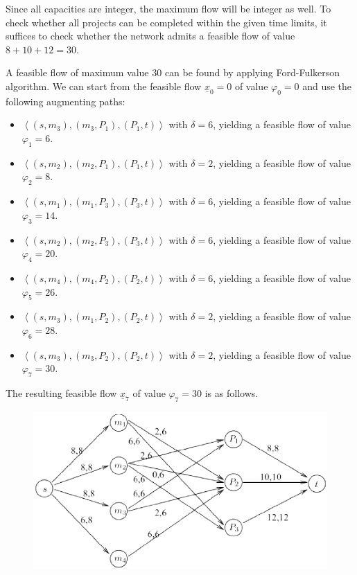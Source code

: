 \documentclass[12pt, a4paper]{report}
\begin{document}
        Since all capacities are integer, the maximum flow will be integer as well. To check whether all projects can be completed within the given time limits, it suffices to check 
        whether the network admits a feasible flow of value $8 + 10 + 12 = 30$.

        A feasible flow of maximum value $30$ can be found by applying Ford-Fulkerson algorithm. We can start from the feasible flow $\underline{x}_0 = 0$ of value $\varphi_0 = 0$ 
        and use the following augmenting paths:
        \begin{itemize}
            \item $\left\langle (s, m_3),(m_3, P_1),(P_1, t) \right\rangle$ with $\delta = 6$, yielding a feasible flow of value $\varphi_1 = 6$.
            \item $\left\langle (s, m_2),(m_2, P_1),(P_1, t) \right\rangle$ with $\delta = 2$, yielding a feasible flow of value $\varphi_2 = 8$.
            \item $\left\langle (s, m_1),(m_1, P_3),(P_3, t) \right\rangle$ with $\delta = 6$, yielding a feasible flow of value $\varphi_3 = 14$.
            \item $\left\langle (s, m_2),(m_2, P_3),(P_3, t) \right\rangle$ with $\delta = 6$, yielding a feasible flow of value $\varphi_4 = 20$.
            \item $\left\langle (s, m_4),(m_4, P_2),(P_2, t) \right\rangle$ with $\delta = 6$, yielding a feasible flow of value $\varphi_5 = 26$.
            \item $\left\langle (s, m_3),(m_1, P_2),(P_2, t) \right\rangle$ with $\delta = 2$, yielding a feasible flow of value $\varphi_6 = 28$.
            \item $\left\langle (s, m_3),(m_3, P_2),(P_2, t) \right\rangle$ with $\delta = 2$, yielding a feasible flow of value $\varphi_7 = 30$.
        \end{itemize}
        The resulting feasible flow $\underline{x}_7$ of value $\varphi_7 = 30$ is as follows.
        \begin{figure}[H]
            \centering
            \includegraphics[width=0.5\linewidth]{images/inflow2.png}
        \end{figure}
\end{document}
